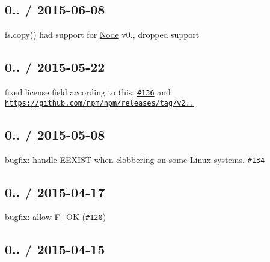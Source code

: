 \subsection*{0.. / 2015-\/06-\/08 }


\begin{DoxyItemize}
\item {\ttfamily fs.\+copy()} had support for \mbox{\hyperlink{classNode}{Node}} v0., dropped support
\end{DoxyItemize}

\subsection*{0.. / 2015-\/05-\/22 }


\begin{DoxyItemize}
\item fixed license field according to this\+: \href{https://github.com/jprichardson/node-fs-extra/pull/136}{\tt \#136} and \href{https://github.com/npm/npm/releases/tag/v2.10.0}{\tt https\+://github.\+com/npm/npm/releases/tag/v2..}
\end{DoxyItemize}

\subsection*{0.. / 2015-\/05-\/08 }


\begin{DoxyItemize}
\item bugfix\+: handle {\ttfamily E\+E\+X\+I\+ST} when clobbering on some Linux systems. \href{https://github.com/jprichardson/node-fs-extra/pull/134}{\tt \#134}
\end{DoxyItemize}

\subsection*{0.. / 2015-\/04-\/17 }


\begin{DoxyItemize}
\item bugfix\+: allow {\ttfamily F\+\_\+\+OK} (\href{https://github.com/jprichardson/node-fs-extra/issues/120}{\tt \#120})
\end{DoxyItemize}

\subsection*{0.. / 2015-\/04-\/15 }


